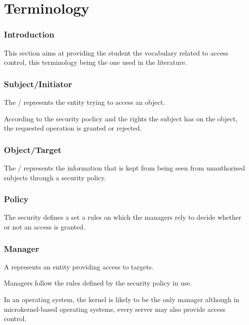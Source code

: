 %
%

\section{Terminology}


\begin{frame}
  \frametitle{Introduction}

  This section aims at providing the student the vocabulary related to
  access control, this terminology being the one used in the literature.
\end{frame}


\begin{frame}
  \frametitle{Subject/Initiator}

  The / represents the entity trying to access
  an object.

  \-

  According to the security poclicy and the rights the subject has on the
  object, the requested operation is granted or rejected.
\end{frame}


\begin{frame}
  \frametitle{Object/Target}

  The / represents the information that is kept
  from being seen from unauthorised subjects through a security policy.
\end{frame}


\begin{frame}
  \frametitle{Policy}

  The security  defines a set a rules on which the
  managers rely to decide whether or not an access is granted.
\end{frame}


\begin{frame}
  \frametitle{Manager}

  A  represents an entity providing access to targets.

  \-

  Managers follow the rules defined by the security policy in use.

  \-

  In an operating system, the kernel is likely to be the only manager although
  in microkernel-based operating systems, every server may also provide access
  control.
\end{frame}

